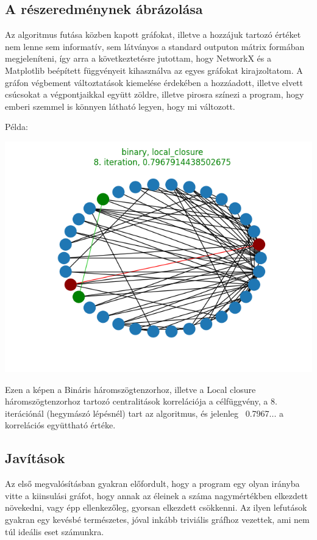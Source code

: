\documentclass[12pt,numbers=noenddot]{report}
\begin{document}
\subsection{A részeredménynek ábrázolása}
Az algoritmus futása közben kapott gráfokat, illetve a hozzájuk tartozó értéket
nem lenne sem informatív, sem látványos a standard outputon mátrix formában 
megjeleníteni, így arra a következtetésre jutottam, hogy NetworkX és a 
Matplotlib beépített függvényeit kihasználva az egyes gráfokat kirajzoltatom.
A gráfon végbement változtatások kiemelése érdekében a hozzáadott, illetve
elvett csúcsokat a végpontjaikkal együtt zöldre, illetve pirosra színezi
a program, hogy emberi szemmel is könnyen látható legyen, hogy mi változott.

Példa:

\includegraphics[width=0.9\linewidth]{./images/find_similar_partial_result.png}

Ezen a képen a Bináris háromszögtenzorhoz, illetve a Local closure 
háromszögtenzorhoz tartozó centralitások korrelációja a célfüggvény,
a 8. iterációnál (hegymászó lépésnél) tart az algoritmus, és jelenleg 
~0.7967... a korrelációs együttható értéke.

\subsection{Javítások}

Az első megvalósításban gyakran előfordult, hogy a program egy olyan irányba
vitte a kiinsulási gráfot, hogy annak az éleinek a száma nagymértékben elkezdett
növekedni, vagy épp ellenkezőleg, gyorsan elkezdett csökkenni. 
Az ilyen lefutások gyakran egy kevésbé természetes, jóval inkább triviális 
gráfhoz vezettek, ami nem túl ideális eset számunkra.
\end{document}
